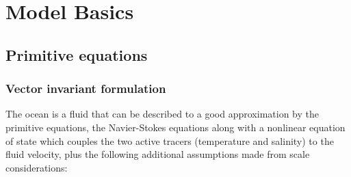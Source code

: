 \documentclass[../main/NEMO_manual]{subfiles}
\begin{document}
\chapter{Model Basics}
\label{chap:PE}
\minitoc

\newpage

\section{Primitive equations}
\label{sec:PE_PE}


\subsection{Vector invariant formulation}
\label{subsec:PE_Vector}

The ocean is a fluid that can be described to a good approximation by the primitive equations,
\ie the Navier-Stokes equations along with a nonlinear equation of state which
couples the two active tracers (temperature and salinity) to the fluid velocity,
plus the following additional assumptions made from scale considerations:
\end{document}
